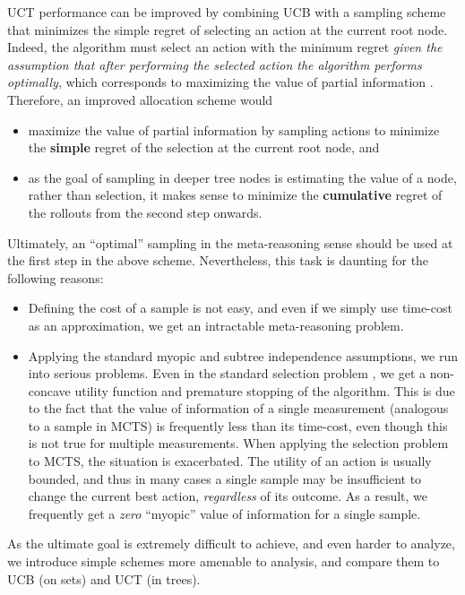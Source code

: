 \documentclass[letterpaper]{article}
\begin{document}
UCT performance can be improved by combining UCB with a sampling
scheme that minimizes the simple regret of selecting an action at the
current root node. Indeed, the algorithm must select an action with
the minimum regret \emph{given the assumption that after performing the selected action
the algorithm performs optimally}, which corresponds to maximizing the
value of partial information \cite{Russell.aima}. Therefore, an
improved allocation scheme would
\begin{itemize}
\item maximize the value of partial
information by sampling actions to
minimize the \textbf{simple} regret
of the selection at the current root node, and
\item as the goal of sampling in deeper tree nodes is estimating the value of
a node, rather than selection, it makes sense to
minimize the \textbf{cumulative} regret of the rollouts from the second
step onwards. 
\end{itemize}
Ultimately, an ``optimal'' sampling in the meta-reasoning sense should
be used at the first step in the above scheme. Nevertheless, this task
is daunting for the following reasons:
\begin{itemize}
\item Defining the cost of a sample is not easy, and even if we simply
  use time-cost as an approximation, we get an intractable
  meta-reasoning problem.
\item Applying the standard myopic and subtree independence
  assumptions, we run into serious problems. Even in the standard
  selection problem \cite{TolpinShimony.blinkered}, we get a
  non-concave utility function and premature stopping of the
  algorithm. This is due to the fact that the value of information of
  a single measurement (analogous to a sample in MCTS) is frequently
  less than its time-cost, even though this is not true for multiple
  measurements.  When applying the selection problem to MCTS, the
  situation is exacerbated.  The utility of an action is usually
  bounded, and thus in many cases a single sample may be insufficient
  to change the current best action, \emph{regardless} of its
  outcome. As a result, we frequently get a \emph{zero} ``myopic''
  value of information for a single sample.
\end{itemize}
As the ultimate goal is extremely difficult
to achieve, and even harder to analyze, we introduce
simple schemes more amenable to analysis, and compare
them to UCB (on sets) and UCT (in trees). 
\end{document}
